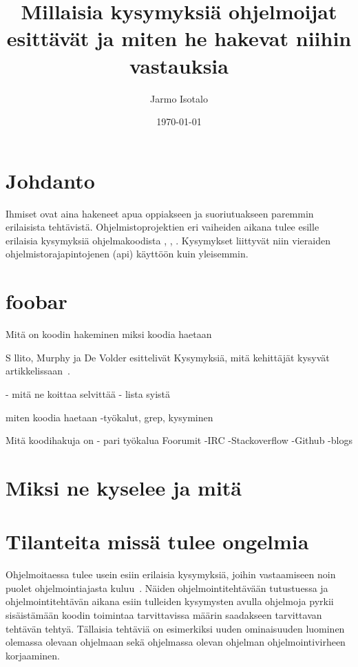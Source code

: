 \documentclass[finnish]{../tktltiki2}
\title{Millaisia kysymyksiä ohjelmoijat esittävät ja miten he hakevat niihin vastauksia}
\author{Jarmo Isotalo}
\date{\today}
\theoremstyle{definition}
\theoremstyle{remark}
\begin{document}

\frontmatter      %

\maketitle        %

\tableofcontents  %


\mainmatter       %

\section{Johdanto}
Ihmiset ovat aina hakeneet apua oppiakseen ja suoriutuakseen paremmin erilaisista tehtävistä. %
Ohjelmistoprojektien eri vaiheiden aikana tulee esille erilaisia kysymyksiä ohjelmakoodista \cite{g_search_code}, \cite{questions-during-software-evolution-tasks}, \cite{asking-and-answering-api-questions}.
Kysymykset liittyvät niin vieraiden ohjelmistorajapintojenen (api) käyttöön \cite{jungloid-mining} kuin yleisemmin.

\section{foobar}
Mitä on koodin hakeminen
miksi koodia haetaan

S
llito, Murphy ja De Volder esittelivät Kysymyksiä, mitä kehittäjät kysyvät artikkelissaan~\cite{questions-during-software-evolution-tasks}.

- mitä ne koittaa selvittää
  - lista syistä

miten koodia haetaan
-työkalut, grep, kysyminen

Mitä koodihakuja on
- pari työkalua
Foorumit
-IRC
-Stackoverflow
-Github
-blogs

\section{Miksi ne kyselee ja mitä}
\section{Tilanteita missä tulee ongelmia }
Ohjelmoitaessa tulee usein esiin erilaisia kysymyksiä, joihin vastaamiseen noin puolet ohjelmointiajasta kuluu~\cite{eliciting-design-requirements-for-maintenance-oriented-ides}. Näiden ohjelmointitehtävään tutustuessa ja ohjelmointitehtävän aikana esiin tulleiden kysymysten avulla ohjelmoja pyrkii sisäistämään koodin toimintaa tarvittavissa määrin saadakseen tarvittavan tehtävän tehtyä. Tällaisia tehtäviä on esimerkiksi uuden ominaisuuden luominen olemassa olevaan ohjelmaan sekä ohjelmassa olevan ohjelman ohjelmointivirheen korjaaminen.
\end{document}
